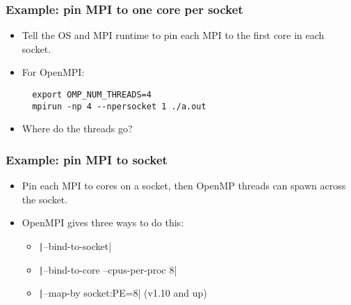 \documentclass{beamer}
\begin{document}
\begin{frame}[fragile]
\frametitle{Example: pin MPI to one core per socket}
\begin{itemize}
  \item Tell the OS and MPI runtime to pin each MPI to the first core in each socket.
  \item For OpenMPI:
  \begin{verbatim}
  export OMP_NUM_THREADS=4
  mpirun -np 4 --npersocket 1 ./a.out
  \end{verbatim}
  \item Where do the threads go?
\end{itemize}


\begin{center}
\begin{adjustbox}{max width={\textwidth}}
\end{adjustbox}
\end{center}


\end{frame}

\begin{frame}
\frametitle{Example: pin MPI to socket}
\begin{itemize}
  \item Pin each MPI to cores on a socket, then OpenMP threads can spawn across the socket.
  \item OpenMPI gives three ways to do this:
  \begin{itemize}
    \item \texttt|--bind-to-socket|
    \item \texttt|--bind-to-core --cpus-per-proc 8|
    \item \texttt|--map-by socket:PE=8| (v1.10 and up)
  \end{itemize}
\end{itemize}
\end{frame}
\end{document}
